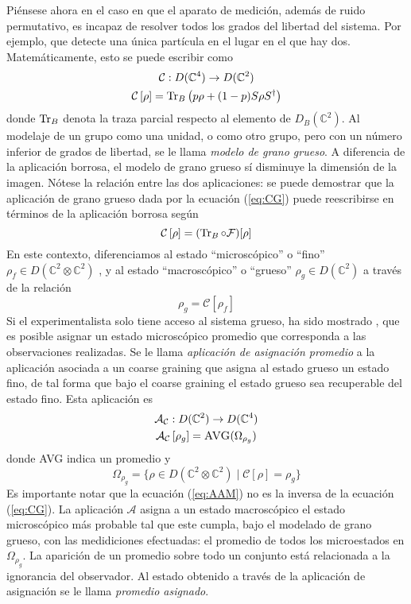 \documentclass[onecolumn,11pt]{article}
\newcommand{\mcF}{\mathcal{F}}
\newcommand{\mcC}{\mathcal{C}}
\newcommand{\mcA}{\mathcal{A}}
\newcommand{\Complex}{\mathbb{C}} %
\newcommand{\CG}[1]{\mcC\left[#1\right]}
\begin{document}
Piénsese ahora en el caso en que el aparato de medición, además de ruido permutativo, es incapaz de resolver todos los grados del libertad del sistema. Por ejemplo, que detecte una única partícula en el lugar en el que hay dos. Matemáticamente, esto se puede escribir como
\begin{gather}
\mcC:D(\Complex^{4})\rightarrow D(\Complex^{2})\label{eq:CGDom}\\
\mcC\left[\rho\right]=\Tr_{B}\left(p\rho+(1-p)S\rho S^{\dag}\right)\label{eq:CG}
\end{gather}
donde $\Tr_{B}$ denota la traza parcial respecto al elemento de $D_{B}(\Complex^{2})$. Al modelaje de un grupo como una unidad, o como otro grupo, pero con un número inferior de grados de libertad, se le llama \textit{modelo de grano grueso}. A diferencia de la aplicación borrosa, el modelo de grano grueso sí disminuye la dimensión de la imagen. Nótese la relación entre las dos aplicaciones: se puede demostrar \cite{FuzzyMeasurements} que la aplicación de grano grueso dada por la ecuación (\ref{eq:CG}) puede reescribirse en términos de la aplicación borrosa según
\begin{equation}
\CG{\rho}=(\Tr_{B}\circ\mcF)[\rho]
\end{equation}
En este contexto, diferenciamos al estado ``microscópico'' o ``fino'' $\rho_{f}\in D(\Complex^{2}\otimes\Complex^{2})$ , y al estado ``macroscópico'' o ``grueso'' $\rho_{g}\in D(\Complex^{2})$ a través de la relación
\begin{equation}
    \rho_{g}=\CG{\rho_{f}}
\end{equation}
Si el experimentalista solo tiene acceso al sistema grueso, ha sido mostrado \cite{Macro-To-Micro}, que es posible asignar un estado microscópico promedio que corresponda a las observaciones realizadas. Se le llama \textit{aplicación de asignación promedio} a la aplicación asociada a un coarse graining que asigna al estado grueso un estado fino, de tal forma que bajo el coarse graining el estado grueso sea recuperable del estado fino. Esta aplicación es
\begin{gather}
\mcA_{\mcC}:D(\Complex^{2})\rightarrow D(\Complex^{4})\label{eq:AAMDom}\\
\mcA_{\mcC}\left[\rho_{g}\right]=\textsc{AVG}(\Omega_{\rho_{g}})\label{eq:AAM}
\end{gather}
donde \textsc{AVG} indica un promedio y
\begin{equation}
\Omega_{\rho_{g}}=\{\rho\in D(\Complex^{2}\otimes\Complex^{2}) \mid \CG{\rho}=\rho_{g}\}
\end{equation}
Es importante notar que la ecuación (\ref{eq:AAM}) no es la inversa de la ecuación (\ref{eq:CG}). La aplicación $\mcA$ asigna a un estado macroscópico el estado microscópico más probable tal que este cumpla, bajo el modelado de grano grueso, con las medidiciones efectuadas: el promedio de todos los microestados en $\Omega_{\rho_{g}}$. La aparición de un promedio sobre todo un conjunto está relacionada a la ignorancia del observador. Al estado obtenido a través de la aplicación de asignación se le llama \textit{promedio asignado}.
\vspace{0.5cm}
\end{document}
